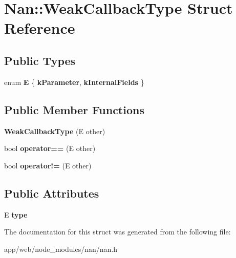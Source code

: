 \hypertarget{struct_nan_1_1_weak_callback_type}{}\section{Nan\+:\+:Weak\+Callback\+Type Struct Reference}
\label{struct_nan_1_1_weak_callback_type}
\subsection*{Public Types}
\begin{DoxyCompactItemize}
\item 
\mbox{\label{struct_nan_1_1_weak_callback_type_ab6479e6963bb220fb335b8ea5b63c8fb}} 
enum {\bfseries E} \{ {\bfseries k\+Parameter}, 
{\bfseries k\+Internal\+Fields}
 \}
\end{DoxyCompactItemize}
\subsection*{Public Member Functions}
\begin{DoxyCompactItemize}
\item 
\mbox{\label{struct_nan_1_1_weak_callback_type_a0e2792d09076c29f12bfa47707213719}} 
{\bfseries Weak\+Callback\+Type} (E other)
\item 
\mbox{\label{struct_nan_1_1_weak_callback_type_ac8d84eb769b3ab3480782174af66f905}} 
bool {\bfseries operator==} (E other)
\item 
\mbox{\label{struct_nan_1_1_weak_callback_type_aa50d71c3dbdb9f8e10a59f4e7931333f}} 
bool {\bfseries operator!=} (E other)
\end{DoxyCompactItemize}
\subsection*{Public Attributes}
\begin{DoxyCompactItemize}
\item 
\mbox{\label{struct_nan_1_1_weak_callback_type_ae89873a9e1253eb3ed85ff2ec7c229ba}} 
E {\bfseries type}
\end{DoxyCompactItemize}


The documentation for this struct was generated from the following file\+:\begin{DoxyCompactItemize}
\item 
app/web/node\+\_\+modules/nan/nan.\+h\end{DoxyCompactItemize}

